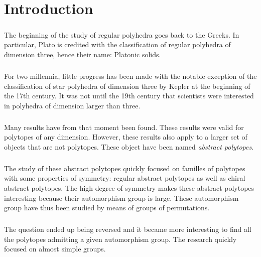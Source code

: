 \chapter*{Introduction}

\paragraph{}
The beginning of the study of regular polyhedra goes back to the Greeks. In particular, Plato is credited with the classification of regular polyhedra of dimension three, hence their name: Platonic solids.

\paragraph{}
For two millennia, little progress has been made with the notable exception of the classification of star polyhedra of dimension three by Kepler at the beginning of the 17th century. It was not until the 19th century that scientists were interested in polyhedra of dimension larger than three.

\paragraph{}
Many results have from that moment been found. These results were valid for polytopes of any dimension. However, these results also apply to a larger set of objects that are not polytopes. These object have been named \textit{abstract polytopes}.

\paragraph{}
The study of these abstract polytopes quickly focused on familles of polytopes with some properties of symmetry: regular abstract polytopes as well as chiral abstract polytopes. The high degree of symmetry makes these abstract polytopes interesting because their automorphism group is large. These automorphism group have thus been studied by means of groups of permutations.

\paragraph{}
The question ended up being reversed and it became more interesting to find all the polytopes admitting a given automorphism group. The research quickly focused on almost simple groups.


